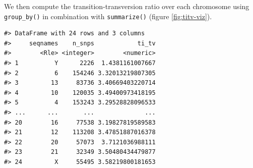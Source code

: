 \documentclass[]{article}
\newenvironment{Shaded}{\begin{snugshade}}{\end{snugshade}}
\newcommand{\DataTypeTok}[1]{\textcolor[rgb]{0.13,0.29,0.53}{#1}}
\newcommand{\KeywordTok}[1]{\textcolor[rgb]{0.13,0.29,0.53}{\textbf{#1}}}
\newcommand{\NormalTok}[1]{#1}
\newcommand{\OperatorTok}[1]{\textcolor[rgb]{0.81,0.36,0.00}{\textbf{#1}}}
\newcommand{\StringTok}[1]{\textcolor[rgb]{0.31,0.60,0.02}{#1}}
\begin{document}
\begin{Shaded}
\end{Shaded}

We then compute the transition-transversion ratio over each chromosome
using \texttt{group\_by()} in combination with \texttt{summarize()}
(figure \ref{fig:titv-viz}).

\begin{Shaded}
\end{Shaded}

\begin{verbatim}
#> DataFrame with 24 rows and 3 columns
#>     seqnames    n_snps            ti_tv
#>        <Rle> <integer>        <numeric>
#> 1          Y      2226  1.4381161007667
#> 2          6    154246 3.32013219807305
#> 3         13     83736 3.40669403220714
#> 4         10    120035 3.49400973418195
#> 5          4    153243 3.29528828096533
#> ...      ...       ...              ...
#> 20        16     77538 3.19827819589583
#> 21        12    113208 3.47851887016378
#> 22        20     57073  3.7121036988111
#> 23        21     32349 3.50480434479877
#> 24         X     55495 3.58219800181653
\end{verbatim}
\end{document}
